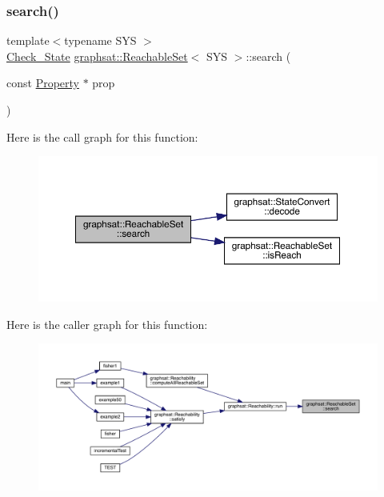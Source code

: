 \subsubsection{\texorpdfstring{search()}{search()}}
{\footnotesize\ttfamily template$<$typename S\+YS $>$ \\
\mbox{\hyperlink{namespacegraphsat_af9decc8bd71e7d6989593798fe86a63a}{Check\+\_\+\+State}} \mbox{\hyperlink{classgraphsat_1_1_reachable_set}{graphsat\+::\+Reachable\+Set}}$<$ S\+YS $>$\+::search (\begin{DoxyParamCaption}\item[{const \mbox{\hyperlink{classgraphsat_1_1_property}{Property}} $\ast$}]{prop }\end{DoxyParamCaption})\hspace{0.3cm}{\ttfamily [inline]}}

Here is the call graph for this function\+:
\nopagebreak
\begin{figure}[H]
\begin{center}
\leavevmode
\includegraphics[width=350pt]{classgraphsat_1_1_reachable_set_a8c10e522762b721f4c24883ff7abb923_cgraph}
\end{center}
\end{figure}
Here is the caller graph for this function\+:
\nopagebreak
\begin{figure}[H]
\begin{center}
\leavevmode
\includegraphics[width=350pt]{classgraphsat_1_1_reachable_set_a8c10e522762b721f4c24883ff7abb923_icgraph}
\end{center}
\end{figure}
\mbox{\label{classgraphsat_1_1_reachable_set_acf559d7f83f427600d8c17e4fed05a03}} 
